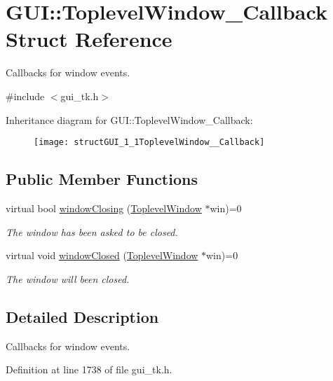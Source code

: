 \hypertarget{structGUI_1_1ToplevelWindow__Callback}{\section{G\-U\-I\-:\-:Toplevel\-Window\-\_\-\-Callback Struct Reference}
\label{structGUI_1_1ToplevelWindow__Callback}
}


Callbacks for window events.  




{\ttfamily \#include $<$gui\-\_\-tk.\-h$>$}

Inheritance diagram for G\-U\-I\-:\-:Toplevel\-Window\-\_\-\-Callback\-:\begin{figure}[H]
\begin{center}
\leavevmode
\texttt{[image: structGUI\_1\_1ToplevelWindow\_\_Callback]}
\end{center}
\end{figure}
\subsection*{Public Member Functions}
\begin{DoxyCompactItemize}
\item 
virtual bool \hyperlink{structGUI_1_1ToplevelWindow__Callback_a3f556e220592d267a7f4d4b79a8f311b}{window\-Closing} (\hyperlink{classGUI_1_1ToplevelWindow}{Toplevel\-Window} $\ast$win)=0
\begin{DoxyCompactList}\small\item\em The window has been asked to be closed. \end{DoxyCompactList}\item 
virtual void \hyperlink{structGUI_1_1ToplevelWindow__Callback_ad02e7827ad3b68f4ea3d0c66fa2a7717}{window\-Closed} (\hyperlink{classGUI_1_1ToplevelWindow}{Toplevel\-Window} $\ast$win)=0
\begin{DoxyCompactList}\small\item\em The window will been closed. \end{DoxyCompactList}\end{DoxyCompactItemize}


\subsection{Detailed Description}
Callbacks for window events. 

Definition at line 1738 of file gui\-\_\-tk.\-h.




